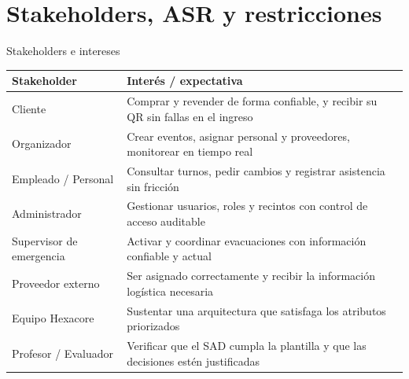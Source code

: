 \documentclass[aspectratio=169,10pt,xcolor={table}]{beamer}
\begin{document}
\section{Stakeholders, ASR y restricciones}

\begin{frame}{Stakeholders e intereses}
  \footnotesize
  \begin{tabular}{L{3.2cm}L{9.6cm}}
    \toprule
    \textbf{Stakeholder} & \textbf{Interés / expectativa} \\
    \midrule
    Cliente & Comprar y revender de forma confiable, y recibir su QR sin fallas en el ingreso \\
    Organizador & Crear eventos, asignar personal y proveedores, monitorear en tiempo real \\
    Empleado / Personal & Consultar turnos, pedir cambios y registrar asistencia sin fricción \\
    Administrador & Gestionar usuarios, roles y recintos con control de acceso auditable \\
    Supervisor de emergencia & Activar y coordinar evacuaciones con información confiable y actual \\
    Proveedor externo & Ser asignado correctamente y recibir la información logística necesaria \\
    Equipo Hexacore & Sustentar una arquitectura que satisfaga los atributos priorizados \\
    Profesor / Evaluador & Verificar que el SAD cumpla la plantilla y que las decisiones estén
      justificadas \\
    \bottomrule
  \end{tabular}
\end{frame}
\end{document}
